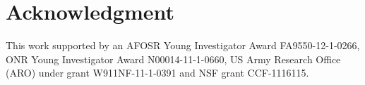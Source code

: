 \documentclass[journal]{IEEEtran}
\begin{document}
%
\IEEEpeerreviewmaketitle






\section*{Acknowledgment}
This work supported by  an AFOSR Young Investigator Award FA9550-12-1-0266, ONR Young Investigator Award N00014-11-1-0660, US Army Research Office (ARO) under grant W911NF-11-1-0391 and  NSF grant CCF-1116115.




\ifCLASSOPTIONcaptionsoff
  \newpage
\fi





%
%
%


\end{document}
